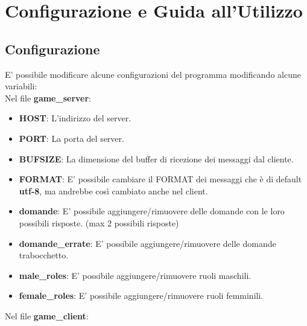 
\section{Configurazione e Guida all'Utilizzo}

\subsection{Configurazione}

\textsf{\normalsize E' possibile modificare alcune configurazioni del programma modificando alcune variabili: } \\

\textsf{\normalsize Nel file \textbf{game\_server}: } \\

\begin{itemize}
	\item \textbf{\small HOST}: L'indirizzo del server.
	\item \textbf{\small PORT}: La porta del server.
	\item \textbf{\small BUFSIZE}: La dimensione del buffer di ricezione dei messaggi dal cliente.
	\item \textbf{\small FORMAT}: E' possibile cambiare il FORMAT dei messaggi che è di default \textbf{utf-8}, ma andrebbe così cambiato anche nel client.
	\item \textbf{\small domande}: E' possibile aggiungere/rimuovere delle domande con le loro possibili risposte. (max 2 possibili risposte)
	\item \textbf{\small domande\_errate}: E' possibile aggiungere/rimuovere delle domande trabocchetto.
	\item \textbf{\small male\_roles}: E' possibile aggiungere/rimuovere ruoli maschili.
	\item \textbf{\small female\_roles}: E' possibile aggiungere/rimuovere ruoli femminili.
\end{itemize}

\textsf{\normalsize Nel file \textbf{game\_client}: } \\

